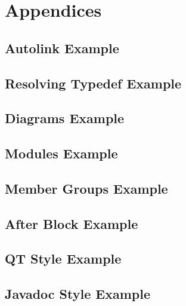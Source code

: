\documentclass{book}
\newcommand{\+}{\discretionary{\mbox{\scriptsize$\hookleftarrow$}}{}{}}
\begin{document}
\part{Appendices}
\appendix
\chapter{Autolink Example}\label{autolink_example}\hypertarget{autolink_example}{}
\chapter{Resolving Typedef Example}\label{restypedef_example}\hypertarget{restypedef_example}{}

{
  \chapter{Diagrams Example}\label{diagrams_example}\hypertarget{diagrams_example}{}
}{}

\chapter{Modules Example}\label{modules_example}\hypertarget{modules_example}{}
\chapter{Member Groups Example}\label{memgrp_example}\hypertarget{memgrp_example}{}
\chapter{After Block Example}\label{afterdoc_example}\hypertarget{afterdoc_example}{}
\chapter{QT Style Example}\label{qtstyle_example}\hypertarget{qtstyle_example}{}
\chapter{Javadoc Style Example}\label{jdstyle_example}\hypertarget{jdstyle_example}{}
\end{document}
